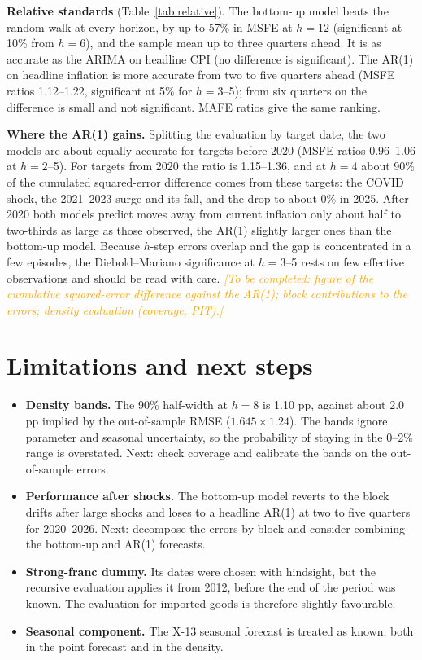 \documentclass[11pt,a4paper]{article}
\newcommand{\todo}[1]{\textcolor{orange}{\textit{[#1]}}}
\begin{document}
\textbf{Relative standards} (Table~\ref{tab:relative}). The bottom-up model beats the random walk at
every horizon, by up to 57\% in MSFE at $h = 12$ (significant at 10\% from $h = 6$), and the sample
mean up to three quarters ahead. It is as accurate as the ARIMA on headline CPI (no difference is
significant). The AR(1) on headline inflation is more accurate from two to five quarters ahead (MSFE
ratios 1.12--1.22, significant at 5\% for $h = 3$--5); from six quarters on the difference is small and
not significant. MAFE ratios give the same ranking.

\textbf{Where the AR(1) gains.} Splitting the evaluation by target date, the two models are about
equally accurate for targets before 2020 (MSFE ratios 0.96--1.06 at $h = 2$--5). For targets from 2020
the ratio is 1.15--1.36, and at $h = 4$ about 90\% of the cumulated squared-error difference comes
from these targets: the COVID shock, the 2021--2023 surge and its fall, and the drop to about 0\% in
2025. After 2020 both models predict moves away from current inflation only about half to two-thirds
as large as those observed, the AR(1) slightly larger ones than the bottom-up model. Because $h$-step errors overlap and the gap is concentrated in a few episodes, the
Diebold--Mariano significance at $h = 3$--5 rests on few effective observations and should be read
with care.
\todo{To be completed: figure of the cumulative squared-error difference against the AR(1); block
contributions to the errors; density evaluation (coverage, PIT).}

\section{Limitations and next steps}\label{sec:limits}
\begin{itemize}
  \item \textbf{Density bands.} The 90\% half-width at $h = 8$ is 1.10 pp, against about 2.0 pp implied
        by the out-of-sample RMSE ($1.645 \times 1.24$). The bands ignore parameter and seasonal
        uncertainty, so the probability of staying in the 0--2\% range is overstated. Next: check
        coverage and calibrate the bands on the out-of-sample errors.
  \item \textbf{Performance after shocks.} The bottom-up model reverts to the block drifts after
        large shocks and loses to a headline AR(1) at two to five quarters for 2020--2026. Next:
        decompose the errors by block and consider combining the bottom-up and AR(1) forecasts.
  \item \textbf{Strong-franc dummy.} Its dates were chosen with hindsight, but the recursive
        evaluation applies it from 2012, before the end of the period was known. The evaluation for
        imported goods is therefore slightly favourable.
  \item \textbf{Seasonal component.} The X-13 seasonal forecast is treated as known, both in the point
        forecast and in the density.
\end{itemize}
\end{document}
